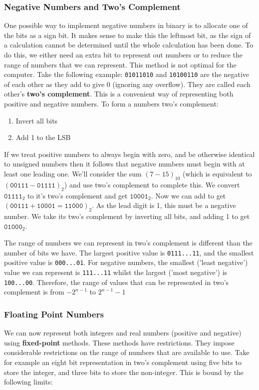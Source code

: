 \documentclass{article}
\begin{document}
	\subsubsection{Negative Numbers and Two's Complement}
	One possible way to implement negative numbers in binary is to allocate one of the bits as a sign bit. It makes sense to make this the leftmost bit, as the sign of a calculation cannot be determined until the whole calculation has been done. To do this, we either need an extra bit to represent out numbers or to reduce the range of numbers that we can represent. This method is not optimal for the computer. Take the following example: \texttt{01011010} and \texttt{10100110} are the negative of each other as they add to give 0 (ignoring any overflow). They are called each other's \textbf{two's complement}. This is a convenient way of representing both positive and negative numbers. To form a numbers two's complement:
	\begin{enumerate}
		\item Invert all bits
		\item Add 1 to the LSB
	\end{enumerate}
	
	If we treat positive numbers to always begin with zero, and be otherwise identical to unsigned numbers then it follows that negative numbers must begin with at least one leading one. We'll consider the sum $(7 - 15)_{10}$ (which is equivalent to $(\texttt{00111} - \texttt{01111})_{2}$) and use two's complement to complete this. We convert $\texttt{01111}_{2}$ to it's two's complement and get $\texttt{10001}_{2}$. Now we can add to get $(\texttt{00111} + \texttt{10001} = \texttt{11000})_{2}$. As the lead digit is 1, this must be a negative number. We take its two's complement by inverting all bits, and adding 1 to get $\texttt{01000}_{2}$. 
	
	\par The range of numbers we can represent in two's complement is different than the number of bits we have. The largest positive value is \texttt{0111...11}, and the smallest positive value is \texttt{000...01}. For negative numbers, the smallest ('least negative') value we can represent is \texttt{111...11} whilst the largest ('most negative') is \texttt{100...00}. Therefore, the range of values that can be represented in two's complement is from $-2^{n-1}$ to $2^{n-1} - 1$
	
	\subsubsection{Floating Point Numbers}
	We can now represent both integers and real numbers (positive and negative) using \textbf{fixed-point} methods. These methods have restrictions. They impose considerable restrictions on the range of numbers that are available to use. Take for example an eight bit representation in two's complement using five bits to store the integer, and three bits to store the non-integer. This is bound by the following limits:
	
\end{document}
